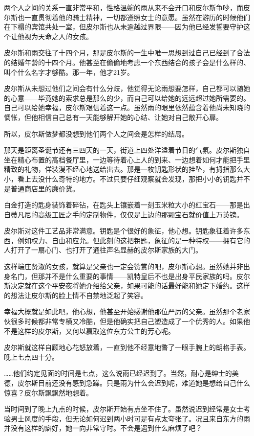 两个人之间的关系一直非常平和，性格温婉的雨从来不会开口和皮尔斯争吵，而皮尔斯也一直贯彻着他的骑士精神，一切都遵照女士的意愿。虽然在游历的时候他们在下榻的宾馆共处一室，但皮尔斯也从未逾越过界限——因为他已经发誓要守护这个让他视为天命之人的女孩。

皮尔斯和雨交往了十四个月，那是皮尔斯的一生中唯一思想到过自己已经到了合法的结婚年龄的十四个月。他甚至在偷偷地考虑一个东西结合的孩子会是什么样的、叫个什么名字才够酷。那一年，他才21岁。

皮尔斯从未想过他们之间会有什么分歧，他觉得无论雨想要怎样，自己都可以随她的心意——毕竟她的索求总是那么的少，而自己可以给她的远远超过她所需要的。自己可以给她幸福，皮尔斯艰信着这一点。虽然雨的眼里依然蕴含着他尚未知晓的惆怅，但他相信自己总有一天能够解开她的心结、让她对自己敞开心扉。

所以，皮尔斯做梦都没想到他们两个人之间会是怎样的结局。

那天是距离圣诞节还有三四天的一天，街道上四处洋溢着节日的气氛。皮尔斯独自坐在精心布置的高档餐厅里，一边等待着心上人的到来、一边想着如何才能把手里精致的礼物，佯装漫不经心地送给出去。那是一枚钥匙形状的挂坠，有拇指那么大小，看上去没什么奇特的地方。不过只要仔细观察就会发现，那把小小的钥匙并不是普通商店里的廉价货。

白金打造的匙身装饰着碎钻，在匙头上镶嵌着一刻玉米粒大小的红宝石——那是出自蒂凡尼的高级工匠之手的定制物件，仅仅是上边的那颗宝石就价值上万英镑。

皮尔斯对这件工艺品非常满意。钥匙是个很好的象征，他心想。钥匙象征着许多东西，例如权力、自由和应允。但此刻的这把钥匙，象征的是一种特权——拥有它的人打开了一扇心门、也打开了通往声名显赫的皮尔斯家族的大门。

这样端庄贤淑的女孩，就算是父亲也一定会赞赏的吧，皮尔斯心想。虽然她并非出身名门，但那并不是什么重要的事情——凯特皇后不也是出身平民家族的吗。皮尔斯决定就在这个平安夜将她介绍给父亲，如果可能的话最好能和她定下婚约。这样的想法让皮尔斯的脸上情不自禁地泛起了笑容。

幸福大概就是如此吧，他心想，他甚至开始感谢他那位严厉的父亲。虽然那个老家伙很多时候都非常专横又冷酷，但是他确实把自己塑造成了一个优秀的人。如果他不是这样的皮尔斯，又何以赢取这位东方公主的芳心呢。

皮尔斯就这样自顾地心花怒放着，一直到他不经意地瞥了一眼手腕上的朗格手表。晚上七点四十分。

……他们约定见面的时间是七点，这么说雨已经迟到了。当然，耐心是绅士的美德，皮尔斯目前还没有感到急躁。只是雨为什么会迟到呢，难道她是想给自己什么惊喜？皮尔斯飘飘然地想着。

当时间到了晚上九点的时候，皮尔斯开始有点坐不住了。虽然说迟到经常是女士考验男士风度的手段，但无论如何迟到两小时可是有点太夸张了。况且来自东方的雨并没有这样的癖好，她一向非常守时。不会是遇到什么麻烦了吧？

